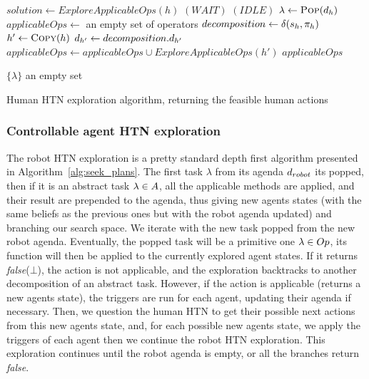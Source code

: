 \documentclass[a4paper,11pt,twoside]{StyleThese}
\begin{document}
\begin{algorithm}[H]
\begin{algorithmic}[1]
\State $solution \leftarrow ExploreApplicableOps(h)$
	\Return $(WAIT)$
\EndIf
\EndFunction
\Statex
{}
	\Return $(IDLE)$
\EndIf
\State $\lambda \leftarrow \textsc{Pop}(d_h)$
	\State $applicableOps \leftarrow$ an empty set of operators
		\State $decomposition \leftarrow \delta(s_h, \pi_h)$
			\State $h' \leftarrow \textsc{Copy}(h)$
			\State $d_{h'} \leftarrow decomposition.d_{h'}$
			\State $applicableOps \leftarrow applicableOps \cup ExploreApplicableOps(h')$
		\EndIf
	\EndFor
	\State \Return $applicableOps$
\EndIf

		\State \Return $\{\lambda\}$
	\Else
		\State \Return an empty set
	\EndIf
\EndIf
\EndFunction
	
\end{algorithmic}
 \caption{Human HTN exploration algorithm, returning the feasible human actions}
 \label{alg:gethactions}
\end{algorithm}

\subsubsection{Controllable agent HTN exploration}
The robot HTN exploration is a pretty standard depth first algorithm presented in Algorithm~\ref{alg:seek_plans}. The first task $\lambda$ from its agenda $d_{robot}$ its popped, then if it is an abstract task $\lambda \in A$, all the applicable methods are applied, and their result are prepended to the agenda, thus giving new agents states (with the same beliefs as the previous ones but with the robot agenda updated) and branching our search space. We iterate with the new task popped from the new robot agenda. Eventually, the popped task will be a primitive one $\lambda \in Op$, its function will then be applied to the currently explored agent states. If it returns \textit{false}($\bot$), the action is not applicable, and the exploration backtracks to another decomposition of an abstract task. However, if the action is applicable (returns a new agents state), the triggers are run for each agent, updating their agenda if necessary. Then, we question the human HTN to get their possible next actions from this new agents state, and, for each possible new agents state, we apply the triggers of each agent then we continue the robot HTN exploration. This exploration continues until the robot agenda is empty, or all the branches return \textit{false}.
\end{document}
